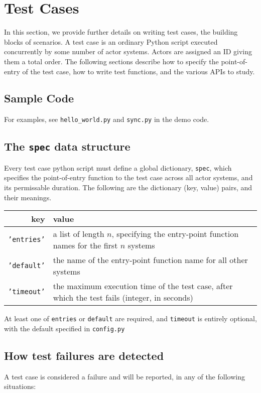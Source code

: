 \section{Test Cases}
In this section, we provide further details on writing test cases, the building
blocks of scenarios. A test case is an ordinary Python script executed
concurrently by some number of actor systems. Actors are assigned an ID giving
them a total order. The following sections describe how to specify the
point-of-entry of the test case, how to write test functions, and the various
APIs to study.

\subsection{Sample Code}
For examples, see {\tt hello\_world.py} and {\tt sync.py} in the demo code.

\subsection{The {\tt spec} data structure}
Every test case python script must define a global dictionary, {\tt spec}, which
specifies the point-of-entry function to the test case across all actor systems,
and its permissable duration.  The following are the dictionary (key, value)
pairs, and their meanings.

\begin{center}
\begin{tabular}{ r | p{8cm} }
    key           & value \\
    \hline
    {\tt 'entries'} 
        & a list of length $n$, specifying the entry-point function names for
          the first $n$ systems \\
    {\tt 'default'}
        & the name of the entry-point function name for all other systems \\
    {\tt 'timeout'}
        & the maximum execution time of the test case, after which the test
          fails (integer, in seconds) \\
\end{tabular}
\end{center}

At least one of {\tt entries} or {\tt default} are required, and {\tt timeout}
is entirely optional, with the default specified in {\tt config.py}

\subsection{How test failures are detected}
A test case is considered a failure and will be reported, in any of the following situations:

